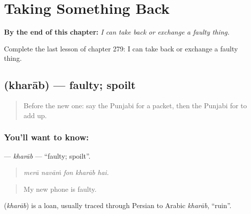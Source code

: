 
\chapter{Taking Something Back}
\label{ch:pa-a2-taking-something-back}

\begin{chapteropening}
\textbf{By the end of this chapter:} \emph{I can take back or exchange a faulty thing.}

Complete the last lesson of chapter 279: I can take back or exchange a faulty thing.
\end{chapteropening}

\section[\texorpdfstring{\pa{ਖ਼ਰਾਬ} (kharāb)}{ਖ਼ਰਾਬ (kharāb)}]{ (kharāb) — faulty; spoilt}

\label{lesson:PA-C279-kharab}



\begin{quote}
Before the new one: say the Punjabi for a packet, then the Punjabi for to add up.
\end{quote}

\subsection*{You'll want to know: }
\textbf{} — \emph{kharāb} — \textquotedblleft{}faulty; spoilt\textquotedblright{}.

\begin{quote}
    
\end{quote}

\begin{quote}
\emph{merā navāṁ fon kharāb hai.}
\end{quote}

\begin{quote}
My new phone is faulty.
\end{quote}

\begin{cousinweb}
\textbf{} (\emph{kharāb}) is a loan, usually traced through Persian to Arabic \emph{kharāb}, \textquotedblleft{}ruin\textquotedblright{}.
\end{cousinweb}

